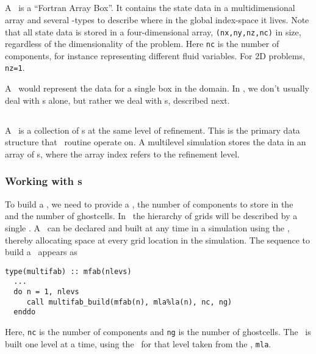 \subsection{\fab}

A \fab\ is a ``Fortran Array Box''.  It contains the state data in a
multidimensional array and several \boxtype-types to describe where in
the global index-space it lives.  
Note that all state data is stored in a four-dimensional array,
{\tt (nx,ny,nz,nc)} in size, regardless of the dimensionality of the
problem.  Here {\tt nc} is the number of components, for instance
representing different fluid variables.  For 2D problems, {\tt nz=1}.

A \fab\ would represent the data for a single box in the domain.
In \maestro, we don't usually deal with \fab s alone, but rather
we deal with \multifab s, described next.

\subsection{\multifab}

A \multifab\ is a collection of \fab s at the same level of
refinement.  This is the primary data structure that \maestro\
routine operate on.  A multilevel simulation stores the 
data in an array of \multifab s, where the array index refers
to the refinement level.

\subsubsection{Working with \multifab s}

To build a \multifab, we need to provide a \layout, the number of
components to store in the \multifab\, and the number of ghostcells.  In
\maestro\, the hierarchy of grids will be described by a single
\mllayout.  A \multifab\ can be declared and built at any time in a
simulation using the \mllayout, thereby allocating space at every
grid location in the simulation.  The sequence to build a \multifab\
appears as
\begin{lstlisting}[language={[95]fortran},mathescape=false]
  type(multifab) :: mfab(nlevs)
  ...
  do n = 1, nlevs
     call multifab_build(mfab(n), mla%la(n), nc, ng)
  enddo
\end{lstlisting}
Here, {\tt nc} is the number of components and {\tt ng} is the number
of ghostcells.  The \multifab\ is built one level at a time, using the
\layout\ for that level taken from the \mllayout, {\tt mla}.

